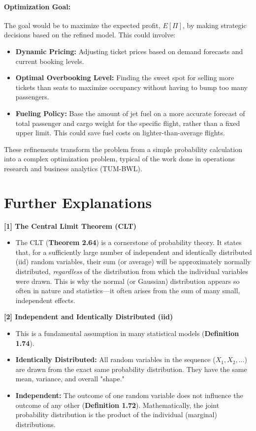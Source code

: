 \documentclass[11pt,a4paper]{article}
\begin{document}
\paragraph{Optimization Goal:}
The goal would be to maximize the expected profit, $E[\Pi]$, by making strategic decisions based on the refined model. This could involve:
\begin{itemize}
    \item \textbf{Dynamic Pricing:} Adjusting ticket prices based on demand forecasts and current booking levels.
    \item \textbf{Optimal Overbooking Level:} Finding the sweet spot for selling more tickets than seats to maximize occupancy without having to bump too many passengers.
    \item \textbf{Fueling Policy:} Base the amount of jet fuel on a more accurate forecast of total passenger and cargo weight for the specific flight, rather than a fixed upper limit. This could save fuel costs on lighter-than-average flights.
\end{itemize}
These refinements transform the problem from a simple probability calculation into a complex optimization problem, typical of the work done in operations research and business analytics (TUM-BWL).

\newpage

\section*{Further Explanations}

\hypertarget{concept:clt}{\textbf{[1] The Central Limit Theorem (CLT)}}
\begin{itemize}
    \item[] The CLT (\textbf{Theorem 2.64}) is a cornerstone of probability theory. It states that, for a sufficiently large number of independent and identically distributed (iid) random variables, their sum (or average) will be approximately normally distributed, \emph{regardless} of the distribution from which the individual variables were drawn. This is why the normal (or Gaussian) distribution appears so often in nature and statistics—it often arises from the sum of many small, independent effects.
\end{itemize}

\hypertarget{concept:iid}{\textbf{[2] Independent and Identically Distributed (iid)}}
\begin{itemize}
    \item[] This is a fundamental assumption in many statistical models (\textbf{Definition 1.74}).
    \item \textbf{Identically Distributed:} All random variables in the sequence ($X_1, X_2, \dots$) are drawn from the exact same probability distribution. They have the same mean, variance, and overall "shape."
    \item \textbf{Independent:} The outcome of one random variable does not influence the outcome of any other (\textbf{Definition 1.72}). Mathematically, the joint probability distribution is the product of the individual (marginal) distributions.
\end{itemize}
\end{document}
